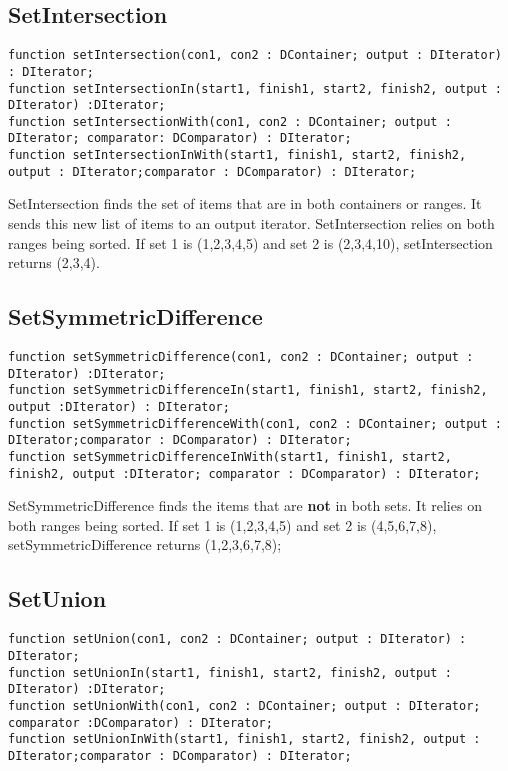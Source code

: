 \documentclass{report}
\begin{document}
\subsection{SetIntersection}

\begin{lstlisting}
function setIntersection(con1, con2 : DContainer; output : DIterator) : DIterator;
function setIntersectionIn(start1, finish1, start2, finish2, output : DIterator) :DIterator;
function setIntersectionWith(con1, con2 : DContainer; output : DIterator; comparator: DComparator) : DIterator;
function setIntersectionInWith(start1, finish1, start2, finish2, output : DIterator;comparator : DComparator) : DIterator;
\end{lstlisting}

SetIntersection finds the set of items that are in both 
containers or ranges. It sends this new list of items to an output iterator. SetIntersection 
relies on both ranges being sorted. If set 1 is (1,2,3,4,5) and set 2 is (2,3,4,10), setIntersection returns 
(2,3,4).

\subsection{SetSymmetricDifference}

\begin{lstlisting}
function setSymmetricDifference(con1, con2 : DContainer; output : DIterator) :DIterator;
function setSymmetricDifferenceIn(start1, finish1, start2, finish2, output :DIterator) : DIterator;
function setSymmetricDifferenceWith(con1, con2 : DContainer; output : DIterator;comparator : DComparator) : DIterator;
function setSymmetricDifferenceInWith(start1, finish1, start2, finish2, output :DIterator; comparator : DComparator) : DIterator;
\end{lstlisting}

SetSymmetricDifference finds the items that are \textbf{not}
in both sets. It relies on both ranges being sorted. If set 1 is (1,2,3,4,5)
and set 2 is (4,5,6,7,8), setSymmetricDifference returns (1,2,3,6,7,8);

\subsection{SetUnion}
\begin{lstlisting}
function setUnion(con1, con2 : DContainer; output : DIterator) : DIterator;
function setUnionIn(start1, finish1, start2, finish2, output : DIterator) :DIterator;
function setUnionWith(con1, con2 : DContainer; output : DIterator; comparator :DComparator) : DIterator;
function setUnionInWith(start1, finish1, start2, finish2, output : DIterator;comparator : DComparator) : DIterator;
\end{lstlisting}
\end{document}
